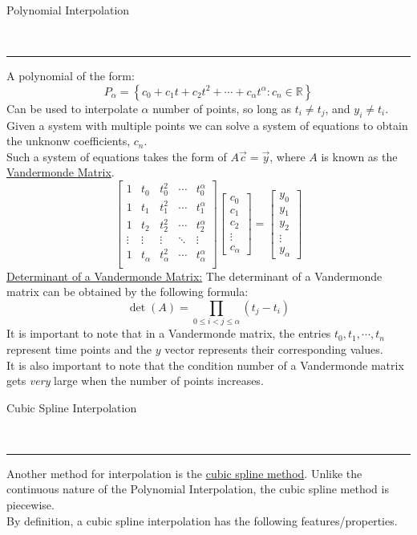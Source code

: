 \documentclass{article}
\newcommand{\header}[1]{\begin{large}\noindent #1\end{large}\\\rule{\textwidth}{0.5pt}}
\newcommand{\gap}{\medskip\\}
\begin{document}
\header{Polynomial Interpolation}
A polynomial of the form:
\[
    P_\alpha = \left\{ c_0 + c_1t + c_2t^2 + \cdots + c_\alpha t^\alpha : c_n \in \mathbb{R}\right\}  
\]
Can be used to interpolate $\alpha$ number of points, so long as $t_i \neq t_j$, and $y_i \neq t_i$.
\gap
Given a system with multiple points we can solve a system of equations to obtain the 
unknonw coefficients, $c_n$.
\gap
Such a system of equations takes the form of $A\vec{c} = \vec{y}$, where $A$ is
known as the \underline{Vandermonde Matrix}.
\[
    \begin{bmatrix}
        1 & t_0 & t_0^2 & \cdots & t_0^\alpha\\
        1 & t_1 & t_1^2 & \cdots & t_1^\alpha\\
        1 & t_2 & t_2^2 & \cdots & t_2^\alpha\\
        \vdots & \vdots & \vdots & \ddots & \vdots\\
        1 & t_\alpha & t_\alpha^2 & \cdots & t_\alpha^\alpha\\
    \end{bmatrix}  
    \begin{bmatrix}
        c_0\\
        c_1\\
        c_2\\
        \vdots\\
        c_\alpha
    \end{bmatrix}
    =
    \begin{bmatrix}
        y_0\\
        y_1\\
        y_2\\
        \vdots\\
        y_\alpha
    \end{bmatrix}
\]
\underline{Determinant of a Vandermonde Matrix:} The determinant of a Vandermonde matrix
can be obtained by the following formula:
\[
    \det(A) = \prod_{0 \leq i < j \leq \alpha}(t_j - t_i)    
\]
It is important to note that in a Vandermonde matrix, the entries $t_0, t_1, \cdots, t_n$
represent time points and the $y$ vector represents their corresponding values.
\gap
It is also important to note that the condition number of a Vandermonde matrix gets
\textit{very} large when the number of points increases.
\gap
\header{Cubic Spline Interpolation}
Another method for interpolation is the \underline{cubic spline method}. Unlike the
continuous nature of the Polynomial Interpolation, the cubic spline method is 
piecewise.
\gap
By definition, a cubic spline interpolation has the following features/properties.
\end{document}
